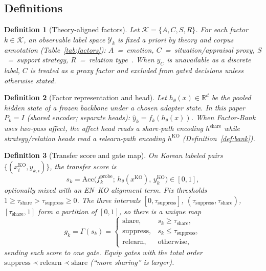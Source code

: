 \documentclass[journal]{IEEEtran}
\newtheorem{definition}{Definition}
\begin{document}
\subsection{Definitions}
\begin{definition}[Theory-aligned factors]
\label{def:factors}
Let $\mathcal{K}=\{A,C,S,R\}$.
For each factor $k\in\mathcal{K}$, an observable label space $\mathcal{Y}_k$ is fixed a priori by theory and corpus annotation (Table~\ref{tab:factors}):
$A$~=~emotion, $C$~=~situation/appraisal proxy, $S$~=~support strategy, $R$~=~relation type~\cite{davis1983empathy,rashkin2019empathetic,liu2021esc,matsumoto2008culture,lee2025koed}.
When $y_C$ is unavailable as a discrete label, $C$ is treated as a \emph{proxy} factor and excluded from gated decisions unless otherwise stated.
\end{definition}

\begin{definition}[Factor representation and head]
\label{def:repr}
Let $h_\theta(x)\in\mathbb{R}^{d}$ be the pooled hidden state of a frozen backbone under a chosen adapter state.
In this paper $P_k{=}I$ (shared encoder; separate heads): $\hat{y}_k=f_k(h_\theta(x))$.
When Factor-Bank uses two-pass affect, the affect head reads a \emph{share-path} encoding $h^{\mathrm{share}}$ while strategy/relation heads read a \emph{relearn-path} encoding $h^{\mathrm{KO}}$ (Definition~\ref{def:bank}).
\end{definition}

\begin{definition}[Transfer score and gate map]
\label{def:score}
On Korean labeled pairs $\{(x_i^{\mathrm{KO}},y_{k,i})\}$, the transfer score is
\begin{equation}
\label{eq:sk}
s_k
=
\mathrm{Acc}\!\big(f_k^{\mathrm{probe}};\, h_\theta(x^{\mathrm{KO}}),\, y_k^{\mathrm{KO}}\big)
\in[0,1],
\end{equation}
optionally mixed with an EN--KO alignment term.
Fix thresholds $1\ge\tau_{\mathrm{share}}>\tau_{\mathrm{suppress}}\ge 0$.
The three intervals
$[0,\tau_{\mathrm{suppress}}]$,
$(\tau_{\mathrm{suppress}},\tau_{\mathrm{share}})$,
$[\tau_{\mathrm{share}},1]$
form a partition of $[0,1]$, so there is a unique map
\begin{equation}
\label{eq:gates}
g_k=\Gamma(s_k)
=
\begin{cases}
\mathrm{share}, & s_k \ge \tau_{\mathrm{share}},\\
\mathrm{suppress}, & s_k \le \tau_{\mathrm{suppress}},\\
\mathrm{relearn}, & \text{otherwise,}
\end{cases}
\end{equation}
sending each score to one gate.
Equip gates with the total order
$\mathrm{suppress}\prec\mathrm{relearn}\prec\mathrm{share}$
(``more sharing'' is larger).
\end{definition}
\end{document}
